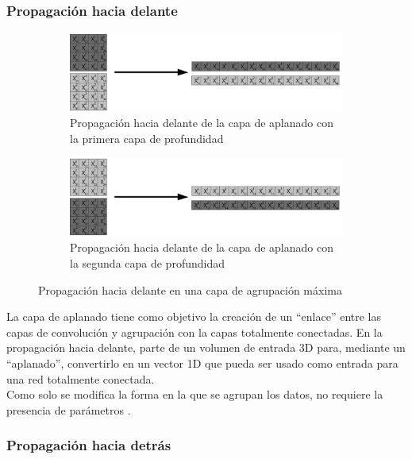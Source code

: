 \subsubsection{Propagación hacia delante}
\begin{figure}[H]
	\centering
	\begin{subfigure}{.5\textwidth}
		\hspace{-10mm}
		\includegraphics[width=2\linewidth]{imagenes/flatten_1.jpg}  
		\caption{Propagación hacia delante de la capa de aplanado con la primera capa de profundidad}
	\end{subfigure}
	\begin{subfigure}{.5\textwidth}
		\hspace{-10mm}
		\includegraphics[width=2\linewidth]{imagenes/flatten_2.jpg}  
		\caption{Propagación hacia delante de la capa de aplanado con la segunda capa de profundidad}
	\end{subfigure}
	
	\caption{Propagación hacia delante en una capa de agrupación máxima}
	\label{fig:forward_prop_flatten_canales_profundidad}
\end{figure}

La capa de aplanado tiene como objetivo la creación de un ``enlace'' entre las capas de convolución y agrupación con la capas totalmente conectadas. En la propagación hacia delante, parte de un volumen de entrada 3D para, mediante un ``aplanado'', convertirlo en un vector 1D que pueda ser usado como entrada para una red totalmente conectada. \\
Como solo se modifica la forma en la que se agrupan los datos, no requiere la presencia de parámetros \cite{flatten_forward}.

\subsubsection{Propagación hacia detrás}

